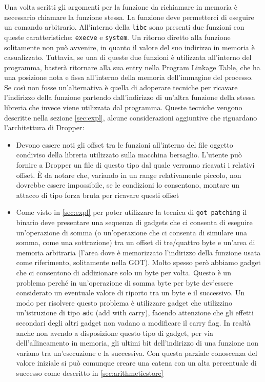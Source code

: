 Una volta scritti gli argomenti per la funzione da richiamare in
memoria è necessario chiamare la funzione stessa. La funzione deve
permetterci di eseguire un comando arbitrario. All'interno della
\lstinline{libc} sono presenti due funzioni con queste
caratteristiche: \lstinline{execve} e \lstinline{system}. Un ritorno
diretto alla funzione solitamente non può avvenire, in quanto il
valore del suo indirizzo in memoria è casualizzato. Tuttavia, se una
di queste due funzioni è utilizzata all'interno del programma, basterà
ritornare alla sua entry nella Program Linkage Table, che ha una
posizione nota e fissa all'interno della memoria dell'immagine del
processo. Se così non fosse un'alternativa è quella di adoperare
tecniche per ricavare l'indirizzo della funzione partendo
dall'indirizzo di un'altra funzione della stessa libreria che invece
viene utilizzata dal programma. Queste tecniche vengono descritte
nella sezione \ref{sec:expl}, alcune considerazioni aggiuntive che
riguardano l'architettura di Dropper:

\begin{itemize}
  \item Devono essere noti gli offset tra le funzioni all'interno del
    file oggetto condiviso della libreria utilizzato sulla macchina
    bersaglio. L'utente può fornire a Dropper un file di questo tipo
    dal quale verranno ricavati i relativi offset. È da notare che,
    variando in un range relativamente piccolo, non dovrebbe essere
    impossibile, se le condizioni lo consentono, montare un attacco di
    tipo forza bruta per ricavare questi offset

  \item Come visto in \ref{sec:expl} per poter utilizzare la tecnica
    di \lstinline{got patching} il binario deve presentare una
    sequenza di gadgets che ci consenta di eseguire un'operazione di
    somma (o un'operazione che ci consenta di simulare una somma, come
    una sottrazione) tra un offset di tre/quattro byte e un'area di
    memoria arbitraria (l'area dove è memorizzato l'indirizzo della
    funzione usata come riferimento, solitamente nella GOT). Molto
    spesso però abbiamo gadget che ci consentono di addizionare solo
    un byte per volta. Questo è un problema perché in un'operazione di
    somma byte per byte dev'essere considerato un eventuale valore di
    riporto tra un byte e il successivo. Un modo per risolvere questo
    problema è utilizzare gadget che utilizzino un'istruzione di tipo
    \lstinline{adc} (add with carry), facendo attenzione che gli
    effetti secondari degli altri gadget non vadano a modificare il
    carry flag. In realtà anche non avendo a disposizione questo tipo
    di gadget, per via dell'allineamento in memoria, gli ultimi bit
    dell'indirizzo di una funzione non variano tra un'esecuzione e la
    successiva. Con questa parziale conoscenza del valore iniziale si
    può comunque creare una catena con un alta percentuale di successo
    come descritto in \ref{sec:arithmeticstore}
\end{itemize}

